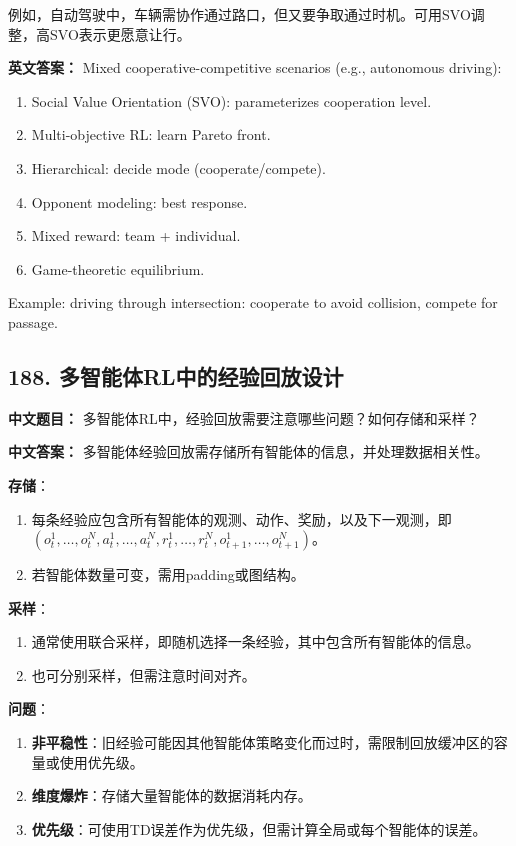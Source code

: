 \documentclass[10pt,a4paper]{ctexart}
\begin{document}
例如，自动驾驶中，车辆需协作通过路口，但又要争取通过时机。可用SVO调整，高SVO表示更愿意让行。

\textbf{英文答案：}  
Mixed cooperative-competitive scenarios (e.g., autonomous driving):

\begin{enumerate}
    \item Social Value Orientation (SVO): parameterizes cooperation level.
    \item Multi-objective RL: learn Pareto front.
    \item Hierarchical: decide mode (cooperate/compete).
    \item Opponent modeling: best response.
    \item Mixed reward: team + individual.
    \item Game-theoretic equilibrium.
\end{enumerate}

Example: driving through intersection: cooperate to avoid collision, compete for passage.

\subsection*{188. 多智能体RL中的经验回放设计}
\textbf{中文题目：} 多智能体RL中，经验回放需要注意哪些问题？如何存储和采样？

\textbf{中文答案：}  
多智能体经验回放需存储所有智能体的信息，并处理数据相关性。

\textbf{存储}：
\begin{enumerate}
    \item 每条经验应包含所有智能体的观测、动作、奖励，以及下一观测，即 $(o_t^1, \dots, o_t^N, a_t^1, \dots, a_t^N, r_t^1, \dots, r_t^N, o_{t+1}^1, \dots, o_{t+1}^N)$。
    \item 若智能体数量可变，需用padding或图结构。
\end{enumerate}

\textbf{采样}：
\begin{enumerate}
    \item 通常使用联合采样，即随机选择一条经验，其中包含所有智能体的信息。
    \item 也可分别采样，但需注意时间对齐。
\end{enumerate}

\textbf{问题}：
\begin{enumerate}
    \item \textbf{\textbf{非平稳性}}：旧经验可能因其他智能体策略变化而过时，需限制回放缓冲区的容量或使用优先级。
    \item \textbf{\textbf{维度爆炸}}：存储大量智能体的数据消耗内存。
    \item \textbf{\textbf{优先级}}：可使用TD误差作为优先级，但需计算全局或每个智能体的误差。
\end{enumerate}
\end{document}

